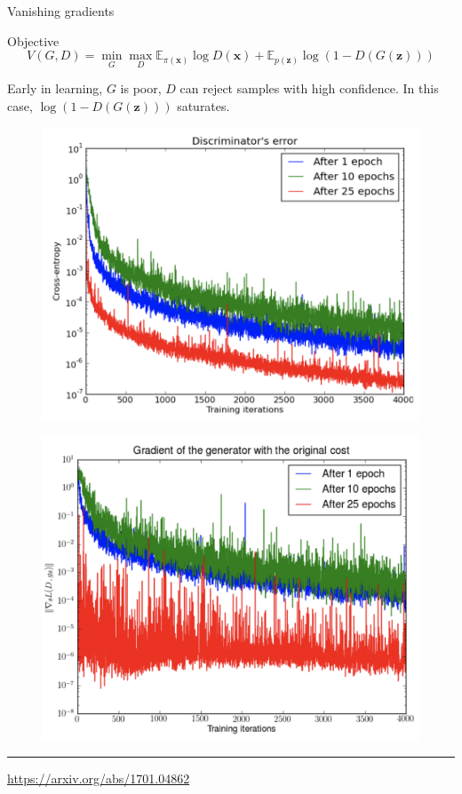 \documentclass{beamer}
\newcommand{\bx}{\mathbf{x}}
\newcommand{\bz}{\mathbf{z}}
\newcommand{\bbE}{\mathbb{E}}
\begin{document}
\begin{frame}{Vanishing gradients}
	\begin{block}{Objective}
		\vspace{-0.4cm}
		\[
		V(G, D) = \min_{G} \max_D \bbE_{\pi(\bx)} \log D(\bx) + \bbE_{p(\bz)} \log (1 - D(G(\bz)))
		\]
		\vspace{-0.4cm}
	\end{block}
	Early in learning, $G$ is poor, $D$ can reject samples with high confidence. In this case, $\log (1 - D(G(\bz)))$ saturates.
	\begin{minipage}[t]{0.5\columnwidth}
		\begin{figure}
			\centering
			\includegraphics[width=0.9\linewidth]{figs/vanishing_gradients_1}
		\end{figure}
	\end{minipage}%
	\begin{minipage}[t]{0.5\columnwidth}
		\begin{figure}
			\centering
			\includegraphics[width=0.9\linewidth]{figs/vanishing_gradients_2}
		\end{figure}
	\end{minipage}
	\vfill
	\hrule\medskip
	{\scriptsize \href{https://arxiv.org/abs/1701.04862}{https://arxiv.org/abs/1701.04862}}
\end{frame}
\end{document}
